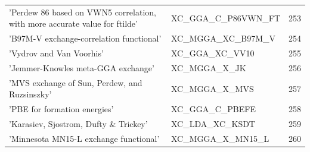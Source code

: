 \documentclass[final,12pt,makeidx,DIV=calc]{article}
\begin{document}
{{{\begin{table}[!h]
\begin{center}
\begin{tabular}{llr}
  'Perdew 86 based on VWN5 correlation, with more accurate value for ftilde' & XC\_GGA\_C\_P86VWN\_FT  &253\\
  'B97M-V exchange-correlation functional' & XC\_MGGA\_XC\_B97M\_V  &254\\
  'Vydrov and Van Voorhis' & XC\_GGA\_XC\_VV10  &255\\
  'Jemmer-Knowles meta-GGA exchange' & XC\_MGGA\_X\_JK  &256\\
  'MVS exchange of Sun, Perdew, and Ruzsinszky' & XC\_MGGA\_X\_MVS  &257\\
  'PBE for formation energies' & XC\_GGA\_C\_PBEFE  &258\\
  'Karasiev, Sjostrom, Dufty \& Trickey' & XC\_LDA\_XC\_KSDT  &259\\
  'Minnesota MN15-L exchange functional' & XC\_MGGA\_X\_MN15\_L  &260\\
\hline
\hline
\end{tabular}
\end{center}
\end{table}

}}}
\end{document}

